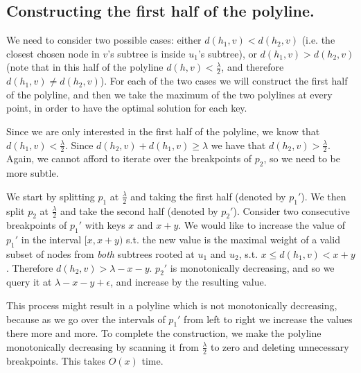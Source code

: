 \documentclass[a4paper,UKenglish]{lipics-v2016}
\theoremstyle{plain}
\begin{document}

\subsection{Constructing the first half of the polyline.} We need to consider two possible cases: either $d(h_1,v) < d(h_2,v)$ (i.e. the closest chosen node in $v$'s subtree is inside $u_1$'s subtree), or $d(h_1,v) > d(h_2,v)$ (note that in this half of the polyline $d(h,v)<\frac{\lambda}{2}$, and therefore $d(h_1,v) \neq d(h_2,v)$). For each of the two cases we will construct the first half of the polyline, and then we take the maximum of the two polylines at every point, in order to have the optimal solution for each key.

\medskip {} Since we are only interested in the first half of the polyline, we know that $d(h_1,v) < \frac{\lambda}{2}$. Since $d(h_2,v) +d(h_1,v)\geq \lambda$ we have that  $d(h_2,v) > \frac{\lambda}{2}$. Again, we cannot afford to iterate over the breakpoints of $p_2$, so we need to be more subtle.

We start by splitting $p_1$ at $\frac{\lambda}{2}$ and taking the first half (denoted by $p_1'$). We then split $p_2$ at $\frac{\lambda}{2}$ and take the second half (denoted by $p_2'$). Consider two consecutive breakpoints of $p_1'$ with keys $x$ and $x+y$. We would like to increase the value of $p_1'$ in the interval $[x,x+y)$ s.t. the new value is the maximal weight of a valid subset of nodes from \emph{both} subtrees rooted at $u_1$ and $u_2$, s.t. $x \leq d(h_1,v)<x+y$. Therefore $d(h_2,v)>\lambda-x-y$. $p_2'$ is monotonically decreasing, and so we query it at $\lambda-x-y+\epsilon$, and increase by the resulting value.

This process might result in a polyline which is not monotonically decreasing, because as we go over the intervals of $p_1'$ from left to right we increase the values there more and more.
To complete the construction, we make the polyline monotonically decreasing by scanning it from $\frac{\lambda}{2}$ to zero and deleting unnecessary breakpoints. This takes $O(x)$ time.
\end{document}
